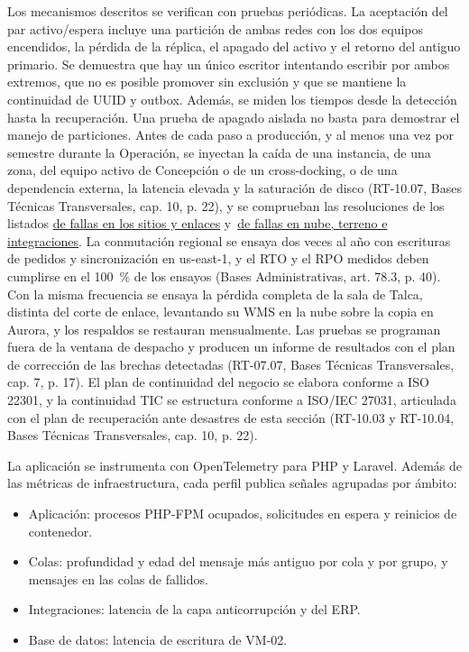 Los mecanismos descritos se verifican con pruebas periódicas. La aceptación del par activo/espera incluye una partición de ambas redes con los dos equipos encendidos, la pérdida de la réplica, el apagado del activo y el retorno del antiguo primario. Se demuestra que hay un único escritor intentando escribir por ambos extremos, que no es posible promover sin exclusión y que se mantiene la continuidad de UUID y outbox. Además, se miden los tiempos desde la detección hasta la recuperación. Una prueba de apagado aislada no basta para demostrar el manejo de particiones. Antes de cada paso a producción, y al menos una vez por semestre durante la Operación, se inyectan la caída de una instancia, de una zona, del equipo activo de Concepción o de un cross-docking, o de una dependencia externa, la latencia elevada y la saturación de disco (RT-10.07, Bases Técnicas Transversales, cap. 10, p. 22), y se comprueban las resoluciones de los listados \hyperref[tab:fallas-sitios]{de fallas en los sitios y enlaces} y~\hyperref[tab:fallas-nube]{de fallas en nube, terreno e integraciones}. La conmutación regional se ensaya dos veces al año con escrituras de pedidos y sincronización en us-east-1, y el RTO y el RPO medidos deben cumplirse en el 100~\% de los ensayos (Bases Administrativas, art. 78.3, p. 40). Con la misma frecuencia se ensaya la pérdida completa de la sala de Talca, distinta del corte de enlace, levantando su WMS en la nube sobre la copia en Aurora, y los respaldos se restauran mensualmente. Las pruebas se programan fuera de la ventana de despacho y producen un informe de resultados con el plan de corrección de las brechas detectadas (RT-07.07, Bases Técnicas Transversales, cap. 7, p. 17). El plan de continuidad del negocio se elabora conforme a ISO 22301, y la continuidad TIC se estructura conforme a ISO/IEC 27031, articulada con el plan de recuperación ante desastres de esta sección (RT-10.03 y RT-10.04, Bases Técnicas Transversales, cap. 10, p. 22).

La aplicación se instrumenta con OpenTelemetry para PHP y Laravel. Además de las métricas de infraestructura, cada perfil publica señales agrupadas por ámbito:

\begin{itemize}
  \item Aplicación: procesos PHP-FPM ocupados, solicitudes en espera y reinicios de contenedor.
  \item Colas: profundidad y edad del mensaje más antiguo por cola y por grupo, y mensajes en las colas de fallidos.
  \item Integraciones: latencia de la capa anticorrupción y del ERP.
  \item Base de datos: latencia de escritura de VM-02.
\end{itemize}

